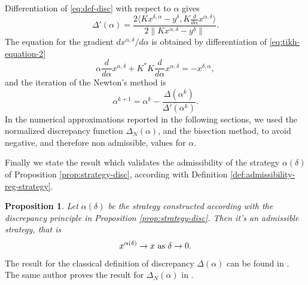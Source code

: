\documentclass[10pt, a4paper, twoside, openright]{book}
\theoremstyle{definition}
\theoremstyle{plain}
\theoremstyle{plain}
\theoremstyle{plain}
\newtheorem{proposition}[subsection]{Proposition}
\theoremstyle{plain}
\theoremstyle{plain}
\theoremstyle{plain}
\theoremstyle{plain}
\theoremstyle{plain}
\begin{document}
Differentiation of \eqref{eq:def-disc} with respect to $\alpha$ gives
\begin{equation}
 \Delta'(\alpha) = \dfrac{2 \langle  Kx^{\delta, \alpha} - y^\delta, K\frac{d}{d\alpha}x^{\alpha, \delta}\rangle}{2\|Kx^{\alpha,\delta} - y^\delta\|}.
\end{equation}
The equation for the gradient $dx^{\alpha,\delta}/d\alpha$ is obtained by differentiation of \eqref{eq:tikh-equation-2}
\begin{equation}
 \alpha\frac{d}{d\alpha}x^{\alpha, \delta} + K^*K\frac{d}{d\alpha}x^{\alpha, \delta} = -x^{\delta, \alpha},
\end{equation}
and the iteration of the Newton's method is
\begin{equation}
 \alpha^{k+1} = \alpha^k - \frac{\Delta(\alpha^k)}{\Delta'(\alpha^k)}.
\end{equation}
In the numerical approximations reported in the following sections, we used the normalized discrepancy function $\Delta_N(\alpha)$, and the bisection method, to avoid negative, and therefore non admissible, values for $\alpha$.
\par
Finally we state the result which validates the admissibility of 
the strategy $\alpha(\delta)$ of Proposition \ref{prop:strategy-disc}, according with Definition \ref{def:admissibility-reg-strategy}.
\begin{proposition}
 Let $\alpha(\delta)$ be the strategy constructed according with the discrepancy principle in Proposition \ref{prop:strategy-disc}. Then it's an admissible strategy, that is
 \begin{equation}
  x^{\alpha(\delta)}\to x \textup{ as }\delta\to0.
 \end{equation}
\end{proposition}
 The result for the classical definition of discrepancy $\Delta(\alpha)$ can be found in \cite{kirsch:book}. The same author proves the result for $\Delta_N(\alpha)$ in \cite{kirsch:shape-1998}.
\end{document}
